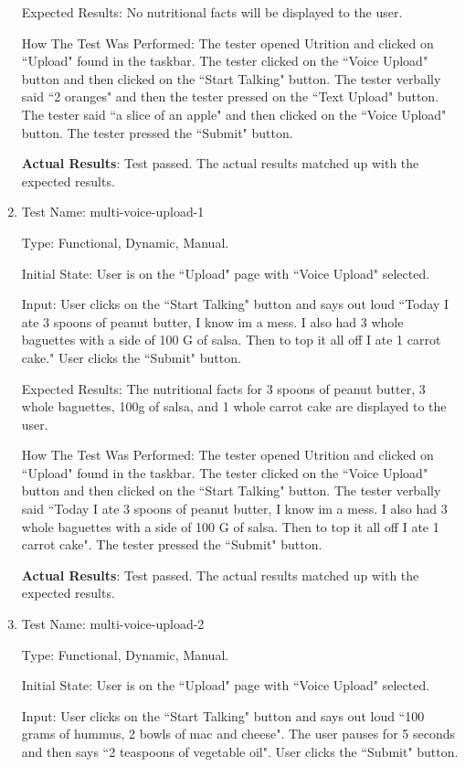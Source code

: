 \documentclass[12pt, titlepage]{article}
\begin{document}
\begin{enumerate}
		Expected Results: No nutritional facts will be displayed to the user.
		
		How The Test Was Performed: The tester opened Utrition and clicked on ``Upload" found in the taskbar. The tester clicked on the ``Voice Upload" button and then clicked on the ``Start Talking" button. The tester verbally said ``2 oranges" and then the tester pressed on the ``Text Upload" button. The tester said ``a slice of an apple" and then clicked on the ``Voice Upload" button. The tester pressed the ``Submit" button.
		
		\textbf{Actual Results}: Test passed. The actual results matched up with the expected results.
		
		\item{Test Name: multi-voice-upload-1}
		
		Type: Functional, Dynamic, Manual.
		
		Initial State: User is on the ``Upload" page with ``Voice Upload" selected.
		
		Input: User clicks on the ``Start Talking" button and says out loud ``Today I ate 3 spoons of peanut butter, I know im a mess. I also had 3 whole baguettes with a side of 100 G of salsa. Then to top it all off I ate 1 carrot cake." User clicks the ``Submit" button.
		
		Expected Results: The nutritional facts for 3 spoons of peanut butter, 3 whole baguettes, 100g of salsa, and 1 whole carrot cake are displayed to the user.
		
		How The Test Was Performed: The tester opened Utrition and clicked on ``Upload" found in the taskbar. The tester clicked on the ``Voice Upload" button and then clicked on the ``Start Talking" button. The tester verbally said ``Today I ate 3 spoons of peanut butter, I know im a mess. I also had 3 whole baguettes with a side of 100 G of salsa. Then to top it all off I ate 1 carrot cake". The tester pressed the ``Submit" button.
		
		\textbf{Actual Results}: Test passed. The actual results matched up with the expected results.
		
		\item{Test Name: multi-voice-upload-2}
		
		Type: Functional, Dynamic, Manual.
		
		Initial State: User is on the ``Upload" page with ``Voice Upload" selected.
		
		Input: User clicks on the ``Start Talking" button and says out loud ``100 grams of hummus, 2 bowls of mac and cheese". The user pauses for 5 seconds and then says ``2 teaspoons of vegetable oil". User clicks the ``Submit" button.
		

\end{enumerate}
\end{document}
